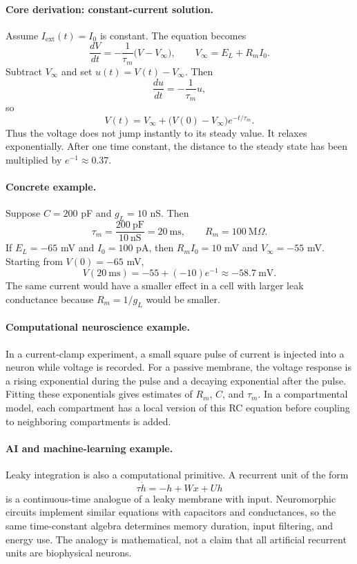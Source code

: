 \paragraph{Core derivation: constant-current solution.}
Assume \(I_{\mathrm{ext}}(t)=I_0\) is constant. The equation becomes
\[
\frac{dV}{dt}=-\frac{1}{\tau_m}\bigl(V-V_\infty\bigr),
\qquad
V_\infty=E_L+R_m I_0.
\]
Subtract \(V_\infty\) and set \(u(t)=V(t)-V_\infty\). Then
\[
\frac{du}{dt}=-\frac{1}{\tau_m}u,
\]
so
\[
\boxed{V(t)=V_\infty+\bigl(V(0)-V_\infty\bigr)e^{-t/\tau_m}.}
\]
Thus the voltage does not jump instantly to its steady value. It relaxes exponentially. After one time constant, the distance to the steady state has been multiplied by \(e^{-1}\approx0.37\).

\paragraph{Concrete example.}
Suppose \(C=200\) pF and \(g_L=10\) nS. Then
\[
\tau_m=\frac{200\ \mathrm{pF}}{10\ \mathrm{nS}}=20\ \mathrm{ms},
\qquad
R_m=100\ \mathrm{M}\Omega.
\]
If \(E_L=-65\) mV and \(I_0=100\) pA, then \(R_m I_0=10\) mV and \(V_\infty=-55\) mV. Starting from \(V(0)=-65\) mV,
\[
V(20\ \mathrm{ms})=-55+(-10)e^{-1}\approx -58.7\ \mathrm{mV}.
\]
The same current would have a smaller effect in a cell with larger leak conductance because \(R_m=1/g_L\) would be smaller.

\paragraph{Computational neuroscience example.}
In a current-clamp experiment, a small square pulse of current is injected into a neuron while voltage is recorded. For a passive membrane, the voltage response is a rising exponential during the pulse and a decaying exponential after the pulse. Fitting these exponentials gives estimates of \(R_m\), \(C\), and \(\tau_m\). In a compartmental model, each compartment has a local version of this RC equation before coupling to neighboring compartments is added.

\paragraph{AI and machine-learning example.}
Leaky integration is also a computational primitive. A recurrent unit of the form
\[
\tau \dot h=-h+Wx+Uh
\]
is a continuous-time analogue of a leaky membrane with input. Neuromorphic circuits implement similar equations with capacitors and conductances, so the same time-constant algebra determines memory duration, input filtering, and energy use. The analogy is mathematical, not a claim that all artificial recurrent units are biophysical neurons.

